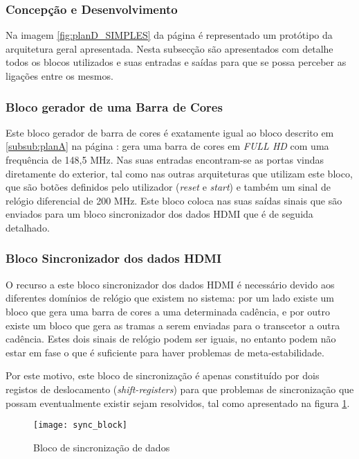 \subsubsection{Concepção e Desenvolvimento}

Na imagem \ref{fig:planD_SIMPLES} da página \pageref{fig:planD_SIMPLES} é representado um protótipo da arquitetura geral apresentada. Nesta subsecção são apresentados com detalhe todos os blocos utilizados e suas entradas e saídas para que se possa perceber as ligações entre os mesmos. 

\subsubsection*{Bloco gerador de uma Barra de Cores} \label{subsub:serial_colorBarGenerator}

Este bloco gerador de barra de cores é exatamente igual ao bloco descrito em \ref{subsub:planA} na página \pageref{subsub:planA}: gera uma barra de cores em \textit{FULL HD} com uma frequência de 148,5 MHz. Nas suas entradas encontram-se as portas vindas diretamente do exterior, tal como nas outras arquiteturas que utilizam este bloco, que são botões definidos pelo utilizador (\textit{reset} e \textit{start}) e também um sinal de relógio diferencial de 200 MHz. Este bloco coloca nas suas saídas sinais que são enviados para um bloco sincronizador dos dados HDMI que é de seguida detalhado.

\subsubsection*{Bloco Sincronizador dos dados HDMI} \label{subsub:serial_syncsignals}

O recurso a este bloco sincronizador dos dados HDMI é necessário devido aos diferentes domínios de relógio que existem no sistema: por um lado existe um bloco que gera uma barra de cores a uma determinada cadência, e por outro existe um bloco que gera as tramas a serem enviadas para o transcetor a outra cadência. Estes dois sinais de relógio podem ser iguais, no entanto podem não estar em fase o que é suficiente para haver problemas de meta-estabilidade. 

Por este motivo, este bloco de sincronização é apenas constituído por dois registos de deslocamento (\textit{shift-registers}) para que problemas de sincronização que possam eventualmente existir sejam resolvidos, tal como apresentado na figura \ref{fig:sync_block}. 
\begin{figure}[h!]
	\begin{center}
		\leavevmode
		\texttt{[image: sync\_block]}
		\captionsetup{width=1.0\linewidth}
		\caption[Bloco de sincronização de dados]{Bloco de sincronização de dados}
		\label{fig:sync_block}
	\end{center}
\end{figure}

